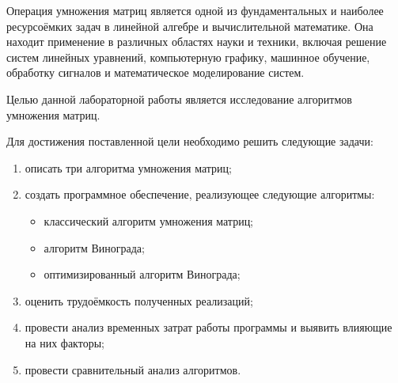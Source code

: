
Операция умножения матриц является одной из фундаментальных и наиболее ресурсоёмких задач в линейной алгебре и вычислительной математике. Она находит применение в различных областях науки и техники, включая решение систем линейных уравнений, компьютерную графику, машинное обучение, обработку сигналов и математическое моделирование систем.

Целью данной лабораторной работы является исследование алгоритмов умножения матриц.

Для достижения поставленной цели необходимо решить следующие задачи:
\begin{enumerate}[label={\arabic*)}]
	\item описать три алгоритма умножения матриц;
	\item создать программное обеспечение, реализующее следующие алгоритмы:
	\begin{itemize}[label=---]
		\item классический алгоритм умножения матриц;
		\item алгоритм Винограда;
		\item оптимизированный алгоритм Винограда;
	\end{itemize}
	\item оценить трудоёмкость полученных реализаций;
	\item провести анализ временных затрат работы программы и выявить влияющие на них факторы;
	\item провести сравнительный анализ алгоритмов.
\end{enumerate}

\clearpage
